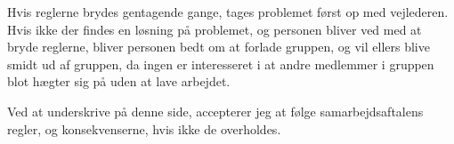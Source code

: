 	Hvis reglerne brydes gentagende gange, tages problemet først op med vejlederen. Hvis ikke der findes en løsning på problemet, og personen bliver ved med at bryde reglerne, bliver personen bedt om at forlade gruppen, og vil ellers blive smidt ud af gruppen, da ingen er interesseret i at andre medlemmer i gruppen blot hægter sig på uden at lave arbejdet.

	Ved at underskrive på denne side, accepterer jeg at følge samarbejdsaftalens regler, og konsekvenserne, hvis ikke de overholdes.
	
\begin{table}[b]
\centering
\label{my-label}
\end{table}
